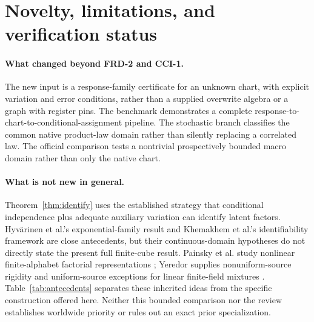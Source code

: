 \documentclass[11pt]{article}
\theoremstyle{definition}\newtheorem{definition}[theorem]{Definition}
\theoremstyle{remark}\newtheorem{remark}[theorem]{Remark}
\begin{document}
\section{Novelty, limitations, and verification status}
\paragraph{What changed beyond FRD-2 and CCI-1.}
The new input is a response-family certificate for an unknown chart, with explicit variation and error conditions, rather than a supplied overwrite algebra or a graph with register pins. The benchmark demonstrates a complete response-to-chart-to-conditional-assignment pipeline. The stochastic branch classifies the common native product-law domain rather than silently replacing a correlated law. The official comparison tests a nontrivial prospectively bounded macro domain rather than only the native chart.

\paragraph{What is not new in general.}
Theorem~\ref{thm:identify} uses the established strategy that conditional independence plus adequate auxiliary variation can identify latent factors. Hyv\"arinen et al.'s exponential-family result \cite[Theorem~3]{hyvarinen} and Khemakhem et al.'s identifiability framework \cite[Theorem~1]{khemakhem} are close antecedents, but their continuous-domain hypotheses do not directly state the present full finite-cube result. Painsky et al. study nonlinear finite-alphabet factorial representations \cite{painsky}; Yeredor supplies nonuniform-source rigidity and uniform-source exceptions for linear finite-field mixtures \cite{yeredor}. Table~\ref{tab:antecedents} separates these inherited ideas from the specific construction offered here. Neither this bounded comparison nor the review establishes worldwide priority or rules out an exact prior specialization.
\end{document}
